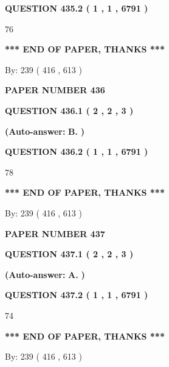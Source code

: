 \documentclass{ctexart}
\begin{document}
  
{\textbf{\large{QUESTION
435.2 
 ( 1 , 1 , 6791 )
}}}

76
   
   
   
   
\vspace{1.0in} 
{\textbf{\large{ *** END OF PAPER, THANKS *** }}} 
   
   
\hspace{1.0in} By: 
 239 ( 416 ,  613 )
   
   
   
   
\newpage 
\setcounter{page}{ 
   436001 } 
   
   
 {\textbf{ \Large{ PAPER NUMBER  436  }}}
   
   
   
   
  
  
{\textbf{\large{QUESTION
436.1 
 ( 2 , 2 , 3 )
}}}
 
 
{\textbf{(Auto-answer:}}
{\textbf{\large{
B.}}}
{\textbf{)}}
 
 
  
  
{\textbf{\large{QUESTION
436.2 
 ( 1 , 1 , 6791 )
}}}

78
   
   
   
   
\vspace{1.0in} 
{\textbf{\large{ *** END OF PAPER, THANKS *** }}} 
   
   
\hspace{1.0in} By: 
 239 ( 416 ,  613 )
   
   
   
   
\newpage 
\setcounter{page}{ 
   437001 } 
   
   
 {\textbf{ \Large{ PAPER NUMBER  437  }}}
   
   
   
   
  
  
{\textbf{\large{QUESTION
437.1 
 ( 2 , 2 , 3 )
}}}
 
 
{\textbf{(Auto-answer:}}
{\textbf{\large{
A.}}}
{\textbf{)}}
 
 
  
  
{\textbf{\large{QUESTION
437.2 
 ( 1 , 1 , 6791 )
}}}

74
   
   
   
   
\vspace{1.0in} 
{\textbf{\large{ *** END OF PAPER, THANKS *** }}} 
   
   
\hspace{1.0in} By: 
 239 ( 416 ,  613 )
   
   
   
\end{document}
